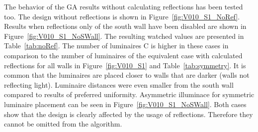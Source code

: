 The behavior of the GA results without calculating reflections has been tested too. The design without reflections is shown in Figure~\ref{fig:V010_S1_NoRef}. Results when reflections only of the south wall have been disabled are shown in Figure~\ref{fig:V010_S1_NoSWall}. The resulting watched values are presented in Table~\ref{tab:noRef}. The number of luminaires C is higher in these cases in comparison to the number of luminaires of the equivalent case with calculated reflections for all walls in Figure~\ref{fig:V010_S1} and Table~\ref{tab:symmetry}. It is common that the luminaires are placed closer to walls that are darker (walls not reflecting light). Luminaire distances were even smaller from the south wall compared to results of preferred uniformity. Asymmetric illuminace for symmetric luminaire placement can be seen in Figure~\ref{fig:V010_S1_NoSWall}. Both cases show that the design is clearly affected by the usage of reflections. Therefore they cannot be omitted from the algorithm.

